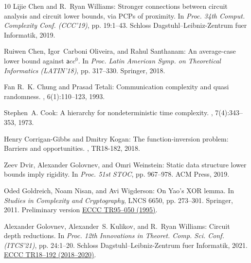 \documentclass[11pt]{article}
\begin{document}
\begin{thebibliography}{10}
{\sc Lijie Chen and R.~Ryan Williams}: Stronger connections between circuit
  analysis and circuit lower bounds, via {PCP}s of proximity.
\newblock In {\em Proc. 34th Comput. Complexity Conf. (CCC'19)}, pp. 19:1--43.
  Schloss Dagstuhl--Leibniz-Zentrum fuer Informatik, 2019.

{\sc Ruiwen Chen, Igor~Carboni Oliveira, and Rahul Santhanam}: An average-case
  lower bound against ${\mathsf acc}^0$.
\newblock In {\em Proc. Latin American Symp. on Theoretical Informatics
  (LATIN'18)}, pp. 317--330. Springer, 2018.
\newblock [\epfmtdoi{10.1007/978-3-319-77404-6\_24}]

{\sc Fan R.~K. Chung and Prasad Tetali}: Communication complexity and quasi
  randomness.
, 6(1):110--123, 1993.
\newblock [\epfmtdoi{10.1137/0406009}]

{\sc Stephen~A. Cook}: A hierarchy for nondeterministic time complexity.
, 7(4):343--353, 1973.
\newblock [\epfmtdoi{10.1016/S0022-0000(73)80028-5}]

{\sc Henry Corrigan{-}Gibbs and Dmitry Kogan}: The function-inversion problem:
  {B}arriers and opportunities.
, TR18-182, 2018.

{\sc Zeev Dvir, Alexander Golovnev, and Omri Weinstein}: Static data structure
  lower bounds imply rigidity.
\newblock In {\em Proc. 51st STOC}, pp. 967--978. ACM Press, 2019.
\newblock [\epfmtdoi{10.1145/3313276.3316348}]

{\sc Oded Goldreich, Noam Nisan, and Avi Wigderson}: On {Y}ao's {XOR} lemma.
\newblock In {\em Studies in Complexity and Cryptography}, LNCS 6650, pp.
  273--301. Springer, 2011.
\newblock Preliminary version
  \href{https://eccc.weizmann.ac.il/report/1995/050/}{ECCC TR95--050 (1995)}.
\newblock [\epfmtdoi{10.1007/978-3-642-22670-0\_23}]

{\sc Alexander Golovnev, Alexander~S. Kulikov, and R.~Ryan Williams}: Circuit
  depth reductions.
\newblock In {\em Proc. 12th Innovations in Theoret. Comp. Sci. Conf.
  (ITCS'21)}, pp. 24:1--20. Schloss Dagstuhl--Leibniz-Zentrum fuer Informatik,
  2021.
\newblock \prelim \href{https://eccc.weizmann.ac.il/report/2018/192/}{ECCC
  TR18--192 (2018--2020)}.


\end{thebibliography}
\end{document}

